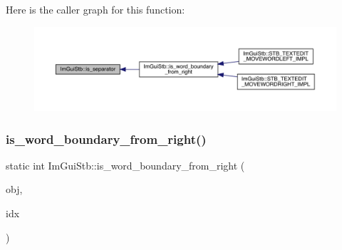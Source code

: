 Here is the caller graph for this function\+:
\nopagebreak
\begin{figure}[H]
\begin{center}
\leavevmode
\includegraphics[width=350pt]{dc/d59/namespace_im_gui_stb_ada7de5d22e36a0bb17592c27dbafc02d_icgraph}
\end{center}
\end{figure}
\mbox{\label{namespace_im_gui_stb_a4e3d14415639a57b7d77dfedfa91b8f7}} 
\subsubsection{\texorpdfstring{is\+\_\+word\+\_\+boundary\+\_\+from\+\_\+right()}{is\_word\_boundary\_from\_right()}}
{\footnotesize\ttfamily static int Im\+Gui\+Stb\+::is\+\_\+word\+\_\+boundary\+\_\+from\+\_\+right (\begin{DoxyParamCaption}\item[{S\+T\+B\+\_\+\+T\+E\+X\+T\+E\+D\+I\+T\+\_\+\+S\+T\+R\+I\+NG $\ast$}]{obj,  }\item[{int}]{idx }\end{DoxyParamCaption})\hspace{0.3cm}{\ttfamily [static]}}

